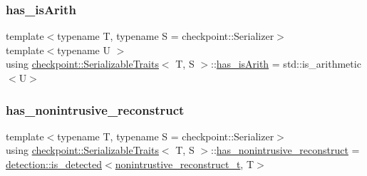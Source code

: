 \subsubsection{\texorpdfstring{has\+\_\+is\+Arith}{has\_isArith}}
{\footnotesize\ttfamily template$<$typename T, typename S = checkpoint\+::\+Serializer$>$ \\
template$<$typename U $>$ \\
using \hyperlink{structcheckpoint_1_1_serializable_traits}{checkpoint\+::\+Serializable\+Traits}$<$ T, S $>$\+::\hyperlink{structcheckpoint_1_1_serializable_traits_a8a8b20be974e219f4fb39b4346be0536}{has\+\_\+is\+Arith} =  std\+::is\+\_\+arithmetic$<$U$>$}

\mbox{\label{structcheckpoint_1_1_serializable_traits_aeaa2e5459d2910f2ed6a8e423b45552b}} 
\subsubsection{\texorpdfstring{has\+\_\+nonintrusive\+\_\+reconstruct}{has\_nonintrusive\_reconstruct}}
{\footnotesize\ttfamily template$<$typename T, typename S = checkpoint\+::\+Serializer$>$ \\
using \hyperlink{structcheckpoint_1_1_serializable_traits}{checkpoint\+::\+Serializable\+Traits}$<$ T, S $>$\+::\hyperlink{structcheckpoint_1_1_serializable_traits_aeaa2e5459d2910f2ed6a8e423b45552b}{has\+\_\+nonintrusive\+\_\+reconstruct} =  \hyperlink{namespacedetection_a30893549a3de1e9603d78dad6d5dce92}{detection\+::is\+\_\+detected}$<$\hyperlink{structcheckpoint_1_1_serializable_traits_abe5231bdf561e55fd9e0673e42a8a96c}{nonintrustive\+\_\+reconstruct\+\_\+t}, T$>$}

\mbox{\label{structcheckpoint_1_1_serializable_traits_abc3628bc485acd98b08840fb99450850}} 
